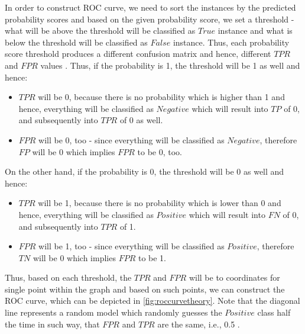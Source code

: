 In order to construct ROC curve, we need to sort the instances by the predicted probability scores and based on the given probability score, we set a threshold - what will be above the threshold will be classified as $True$ instance and what is below the threshold will be classified as $False$ instance. Thus, each probability score threshold produces a different confusion matrix and hence, different $TPR$ and $FPR$ values \citep{fawcett2006introduction}.
Thus, if the probability is 1, the threshold will be 1 as well and hence:
\begin{itemize}\setlength\itemsep{0em}
    \item $TPR$ will be 0, because there is no probability which is higher than 1 and hence, everything will be classified as $Negative$ which will result into $TP$ of 0, and subsequently into $TPR$ of 0 as well.
	\item $FPR$ will be 0, too - since everything will be classified as $Negative$, therefore $FP$ will be 0 which implies $FPR$ to be 0, too.
\end{itemize}
On the other hand, if the probability is 0, the threshold will be 0 as well and hence:
\begin{itemize}\setlength\itemsep{0em}
    \item $TPR$ will be 1, because there is no probability which is lower than 0 and hence, everything will be classified as $Positive$ which will result into $FN$ of 0, and subsequently into $TPR$ of 1.
	\item $FPR$ will be 1, too - since everything will be classified as $Positive$, therefore $TN$ will be 0 which implies $FPR$ to be 1.
\end{itemize}

Thus, based on each threshold, the $TPR$ and $FPR$ will be to coordinates for single point within the graph and based on such points, we can construct the ROC curve, which can be depicted in \autoref{fig:roccurvetheory}.
Note that the diagonal line represents a random model which randomly guesses the $Positive$ class half the time in such way, that $FPR$ and $TPR$ are the same, i.e., 0.5 \citep{fawcett2006introduction}.

